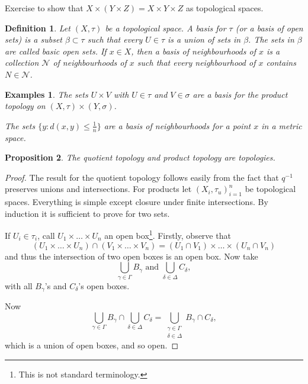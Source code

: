 \documentclass{notes}
\theoremstyle{plain}
\newtheorem{proposition}{Proposition}[chapter]
\newtheorem{definition}[proposition]{Definition}
\newtheorem*{examples}{Examples}
\newcommand{\cN}{\mathcal{N}}
\begin{document}
Exercise to show that $X \times (Y \times Z) = X \times Y \times Z$ as
topological spaces.

\begin{definition}
Let $(X,\tau)$ be a topological space.  A basis%
 for $\tau$ (or a basis of
open sets) is a subset $\beta \subset \tau$ such that every $U \in \tau$ is
a union of sets in $\beta$.  The sets in $\beta$ are called basic open sets.
If $x \in X$, then a basis of neighbourhoods%
 of $x$ is a collection $\cN$ of
neighbourhoods of $x$ such that every neighbourhood of $x$ contains
$N \in \cN$.
\end{definition}

\begin{examples}
\item The sets $U \times V$ with $U \in \tau$ and $V \in \sigma$ are a basis
for the product topology on $(X,\tau) \times (Y,\sigma)$.
\item The sets $\{y : d(x,y) \le \frac{1}{n}\}$ are a basis of neighbourhoods
for a point $x$ in a metric space.
\end{examples}

\begin{proposition}
The quotient topology and product topology are topologies.
\end{proposition}

\begin{proof}
The result for the quotient topology follows easily from the fact that $q^{-1}$
preserves unions and intersections.  For products let $(X_i,\tau_u)_{i=1}^n$
be topological spaces. Everything is simple except closure under finite
intersections.  By induction it is sufficient to prove for two sets.

If $U_i \in \tau_i$, call $U_1 \times \dots \times U_n$ an
{open box}\footnote{This is not standard terminology.}.  Firstly, observe
that
\[
\left(
U_1 \times \dots \times U_n
\right)
\cap
\left(
V_1 \times \dots \times V_n
\right)
=
\left(
U_1 \cap V_1
\right)
\times
\dots
\times
\left(
U_n \cap V_n
\right)
\]
and thus the intersection of two open boxes is an open box.  Now take
\[
\bigcup_{\gamma \in \Gamma} B_\gamma \text{ and } 
\bigcup_{\delta \in \Delta} C_\delta, 
\]
with all $B_\gamma$'s and $C_\delta$'s open boxes.

Now
\[
\bigcup_{\gamma \in \Gamma} B_\gamma \cap 
\bigcup_{\delta \in \Delta} C_\delta = \bigcup_{\substack{\gamma \in \Gamma \\
\delta \in \Delta}}
B_\gamma \cap C_\delta,
\] which is a union of open boxes, and so open.
\end{proof}
\end{document}

